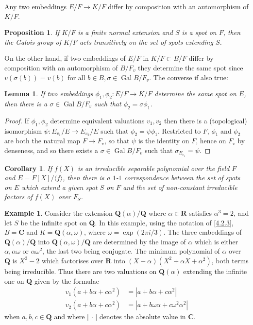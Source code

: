 \documentclass[10pt]{article}
\newtheorem{prop}[theo]{Proposition}
\newtheorem{lemm}[theo]{Lemma}
\newtheorem{coro}[theo]{Corollary}
\theoremstyle{definition}
\newtheorem{exam}[theo]{Example}
\def\<{\langle}
\def\>{\rangle}
\def\QQ{\mathbf{Q}}
\def\RR{\mathbf{R}}
\def\CC{\mathbf{C}}
\DeclareMathOperator{\Gal}{Gal}
\begin{document}
Any two embeddings $E/F \to K/F$ differ by composition with an automorphism of $K/F$.


\begin{prop}
\label{4.2.4}
If $K/F$ is a finite normal extension and $S$ is a spot on $F$, then the Galois group of $K/F$ acts transitively on the set of spots extending $S$.
\end{prop}


On the other hand, if two embeddings of $E/F$ in $K/F \subset B/F$ differ by composition with an automorphism of $B/F_v$ they determine the same spot since $v(\sigma(b)) = v(b)$ for all $b \in B, \sigma \in \Gal B/F_v$.
The converse if also true:


\begin{lemm}
\label{4.2.5}
If two embeddings $\phi_1,\phi_2 : E/F \to K/F$ determine the same spot on $E$, then there is a $\sigma \in \Gal B/F_v$ such that $\phi_2 = \sigma\phi_1$.
\end{lemm}

\begin{proof}
If $\phi_1,\phi_2$ determine equivalent valuations $v_1,v_2$ then there is a (topological) isomorphism $\psi : E_{v_1} / E \to E_{v_2}/E$ such that $\phi_2 = \psi\phi_1$.
Restricted to $F$, $\phi_1$ and $\phi_2$ are both the natural map $F \to F_v$, so that $\psi$ is the identity on $F$, hence on $F_v$ by denseness, and so there exists a $\sigma \in \Gal B/F_v$ such that $\sigma_{E_{v_1}} = \psi$.
\end{proof}


\begin{coro}
\label{4.2.6}
If $f(X)$ is an irreducible separable polynomial over the field $F$ and $E = F[X] / \< f \>$, then there is a $1$-$1$ correspondence between the set of spots on $E$ which extend a given spot $S$ on $F$ and the set of non-constant irreducible factors of $f(X)$ over $F_S$.
\end{coro}


\begin{exam}
\label{4.2.7}
Consider the extension $\QQ(\alpha)/\QQ$ where $\alpha \in \RR$ satisfies $\alpha^3 = 2$, and let $S$ be the infinite spot on $\QQ$.
In this example, using the notation of \ref{4.2.3}, $B = \CC$ and $K = \QQ(\alpha,\omega)$, where $\omega = \exp(2 \pi i / 3)$.
The three embeddings of $\QQ(\alpha)/\QQ$ into $\QQ(\alpha,\omega)/\QQ$ are determined by the image of $\alpha$ which is either $\alpha, \alpha\omega$ or $\alpha\omega^2$, the last two being conjugate.
The minimum polynomial of $\alpha$ over $\QQ$ is $X^3-2$ which factorises over $\RR$ into $(X-\alpha)(X^2 + \alpha X + \alpha^2)$, both terms being irreducible.
Thus there are two valuations on $\QQ(\alpha)$ extending the infinite one on $\QQ$ given by the formulae
\begin{align*}
v_1(a + b\alpha + c\alpha^2) &= |a + b\alpha + c\alpha^2|
\\
v_2(a + b\alpha + c\alpha^2) &= |a + b\omega\alpha + c\omega^2\alpha^2|
\end{align*}
when $a,b,c \in \QQ$ and where $|\,\cdot\,|$ denotes the absolute value in $\CC$.
\end{exam}
\end{document}
